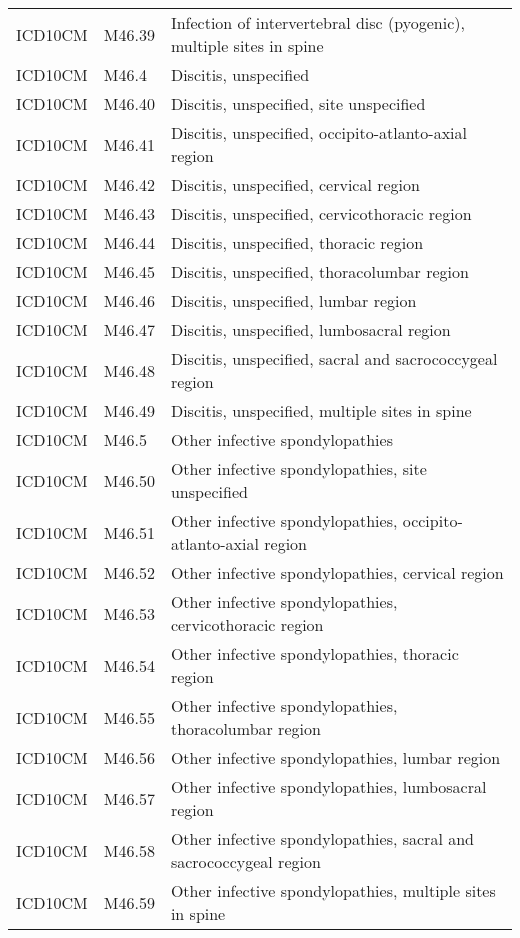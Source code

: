 \begin{longtable}{p{}p{}p{}}
  ICD10CM & M46.39 & Infection of intervertebral disc (pyogenic), multiple sites in spine \\ 
  ICD10CM & M46.4 & Discitis, unspecified \\ 
  ICD10CM & M46.40 & Discitis, unspecified, site unspecified \\ 
  ICD10CM & M46.41 & Discitis, unspecified, occipito-atlanto-axial region \\ 
  ICD10CM & M46.42 & Discitis, unspecified, cervical region \\ 
  ICD10CM & M46.43 & Discitis, unspecified, cervicothoracic region \\ 
  ICD10CM & M46.44 & Discitis, unspecified, thoracic region \\ 
  ICD10CM & M46.45 & Discitis, unspecified, thoracolumbar region \\ 
  ICD10CM & M46.46 & Discitis, unspecified, lumbar region \\ 
  ICD10CM & M46.47 & Discitis, unspecified, lumbosacral region \\ 
  ICD10CM & M46.48 & Discitis, unspecified, sacral and sacrococcygeal region \\ 
  ICD10CM & M46.49 & Discitis, unspecified, multiple sites in spine \\ 
  ICD10CM & M46.5 & Other infective spondylopathies \\ 
  ICD10CM & M46.50 & Other infective spondylopathies, site unspecified \\ 
  ICD10CM & M46.51 & Other infective spondylopathies, occipito-atlanto-axial region \\ 
  ICD10CM & M46.52 & Other infective spondylopathies, cervical region \\ 
  ICD10CM & M46.53 & Other infective spondylopathies, cervicothoracic region \\ 
  ICD10CM & M46.54 & Other infective spondylopathies, thoracic region \\ 
  ICD10CM & M46.55 & Other infective spondylopathies, thoracolumbar region \\ 
  ICD10CM & M46.56 & Other infective spondylopathies, lumbar region \\ 
  ICD10CM & M46.57 & Other infective spondylopathies, lumbosacral region \\ 
  ICD10CM & M46.58 & Other infective spondylopathies, sacral and sacrococcygeal region \\ 
  ICD10CM & M46.59 & Other infective spondylopathies, multiple sites in spine \\ 

\end{longtable}
